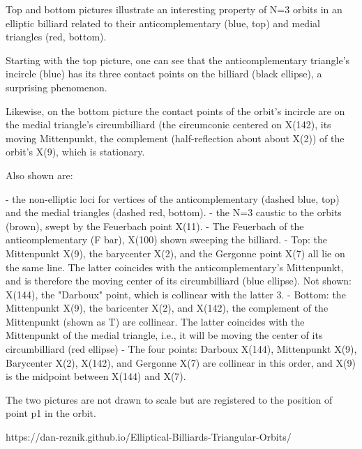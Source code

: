 Top and bottom pictures illustrate an interesting property of N=3 orbits in an elliptic billiard related to their anticomplementary (blue, top) and medial triangles (red, bottom).

Starting with the top picture, one can see that the anticomplementary triangle's incircle (blue) has its three contact points on the billiard (black ellipse), a surprising phenomenon.

Likewise, on the bottom picture the contact points of the orbit's incircle are on the medial triangle's circumbilliard (the circumconic centered on X(142), its moving Mittenpunkt, the complement (half-reflection about about X(2)) of the orbit's X(9), which is stationary.

Also shown are:

- the non-elliptic loci for vertices of the anticomplementary (dashed blue, top) and the medial triangles (dashed red, bottom).
- the N=3 caustic to the orbits (brown), swept by the Feuerbach point X(11).
- The Feuerbach of the anticomplementary (F bar), X(100) shown sweeping the billiard.
- Top: the Mittenpunkt X(9), the barycenter X(2), and the Gergonne point X(7) all lie on the same line. The latter coincides with the anticomplementary's Mittenpunkt, and is therefore the moving center of its circumbilliard (blue ellipse). Not shown: X(144), the "Darboux" point, which is collinear with the latter 3.
- Bottom: the Mittenpunkt X(9), the baricenter X(2), and X(142), the complement of the Mittenpunkt (shown as T) are collinear. The latter coincides with the Mittenpunkt of the medial triangle, i.e., it will be moving the center of its circumbilliard (red ellipse) 
- The four points: Darboux X(144), Mittenpunkt X(9), Barycenter X(2), X(142), and Gergonne X(7) are collinear in this order, and X(9) is the midpoint between X(144) and X(7).

The two pictures are not drawn to scale but are registered to the position of point p1 in the orbit.

https://dan-reznik.github.io/Elliptical-Billiards-Triangular-Orbits/
